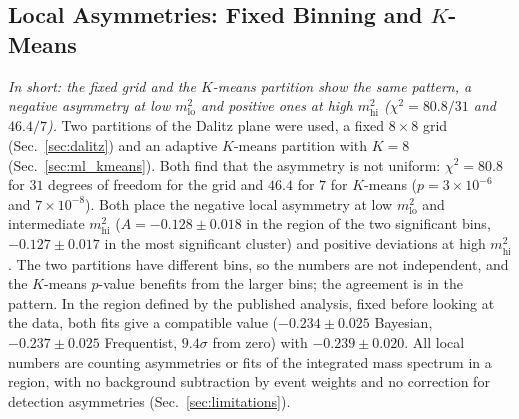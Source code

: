 \subsection{Local Asymmetries: Fixed Binning and $K$-Means}
\label{sec:comparison_local}
\emph{In short: the fixed grid and the $K$-means partition show the same pattern, a negative asymmetry at low $m^2_{\mathrm{lo}}$ and positive ones at high $m^2_{\mathrm{hi}}$ ($\chi^2=80.8/31$ and $46.4/7$).}
Two partitions of the Dalitz plane were used, a fixed $8\times8$ grid (Sec.~\ref{sec:dalitz}) and an adaptive $K$-means partition with $K=8$ (Sec.~\ref{sec:ml_kmeans}). Both find that the asymmetry is not uniform: $\chi^2=80.8$ for $31$ degrees of freedom for the grid and $46.4$ for $7$ for $K$-means ($p=3\times10^{-6}$ and $7\times10^{-8}$). Both place the negative local asymmetry at low $m^2_{\mathrm{lo}}$ and intermediate $m^2_{\mathrm{hi}}$ ($A=-0.128\pm0.018$ in the region of the two significant bins, $-0.127\pm0.017$ in the most significant cluster) and positive deviations at high $m^2_{\mathrm{hi}}$. The two partitions have different bins, so the numbers are not independent, and the $K$-means $p$-value benefits from the larger bins; the agreement is in the pattern. In the region defined by the published analysis, fixed before looking at the data, both fits give a compatible value ($-0.234\pm0.025$ Bayesian, $-0.237\pm0.025$ Frequentist, $9.4\sigma$ from zero) with $-0.239\pm0.020$. All local numbers are counting asymmetries or fits of the integrated mass spectrum in a region, with no background subtraction by event weights and no correction for detection asymmetries (Sec.~\ref{sec:limitations}).
\FloatBarrier
